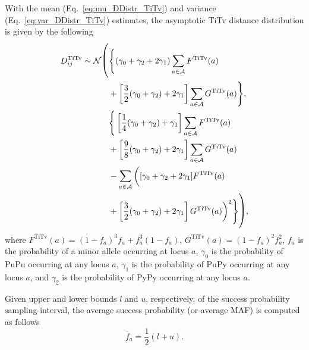 \documentclass[aoas]{imsart}
\begin{document}
With the mean (Eq.~\ref{eq:mu_DDistr_TiTv}) and variance (Eq.~\ref{eq:var_DDistr_TiTv}) estimates, the asymptotic TiTv distance distribution is given by the following
%
\begin{equation}\label{eq:DDistr_TiTv}
\begin{aligned}
D^\text{TiTv}_{ij} \overset{.}{\sim} \mathcal{N}{\fontsize{0.5cm}{1pt}\selectfont \Biggl(}& {\Biggl\{}(\gamma_0 + \gamma_2 + 2\gamma_1) \sum_{a \in \mathcal{A}} F^\text{TiTv}(a) \\
&+ \left[\frac{3}{2}(\gamma_0 + \gamma_2) + 2\gamma_1\right] \sum_{a \in \mathcal{A}} G^\text{TiTv}(a){\Biggr\}}, \\
&{\Biggl\{}\left[\frac{1}{4}(\gamma_0 + \gamma_2) + \gamma_1\right] \sum_{a \in \mathcal{A}} F^\text{TiTv}(a) \\
&+ \left[\frac{9}{8}(\gamma_0 + \gamma_2) + 2\gamma_1\right] \sum_{a \in \mathcal{A}} G^\text{TiTv}(a) \\
&- \sum_{a \in \mathcal{A}} {\biggl(}[\gamma_0 + \gamma_2 + 2\gamma_1] F^\text{TiTv}(a) \\
&+ \left[\frac{3}{2}(\gamma_0 + \gamma_2) + 2\gamma_1\right] G^\text{TiTv}(a){\biggr)}^2{\Biggr\}}{\fontsize{0.5cm}{1pt}\selectfont \Biggr)},
\end{aligned}
\end{equation}
%
where $F^\text{TiTv}(a) = (1 - f_a)^3 f_a + f^3_a (1 - f_a)$, $G^\text{TiTv}(a) = (1 - f_a)^2 f^2_a$, $f_a$ is the probability of a minor allele occurring at locus $a$, $\gamma_0$ is the probability of PuPu occurring at any locus $a$, $\gamma_1$ is the probability of PuPy occurring at any locus $a$, and $\gamma_2$ is the probability of PyPy occurring at any locus $a$.

Given upper and lower bounds $l$ and $u$, respectively, of the success probability sampling interval, the average success probability (or average MAF) is computed as follows
%
\begin{equation}\label{eq:avg_maf}
\bar{f}_a = \frac{1}{2}(l + u).
\end{equation}
\end{document}
